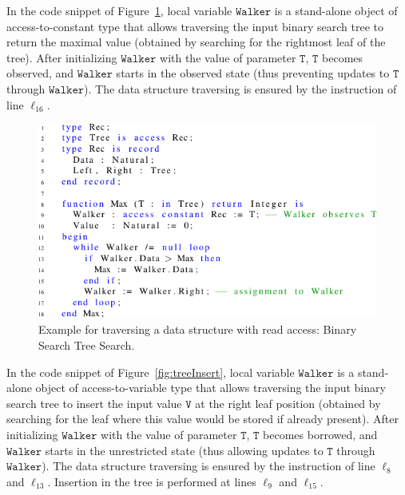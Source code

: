 \documentclass{llncs}
\newcommand\var[1]{\ensuremath{\mathtt{#1}}}
\begin{document}
\smallskip
In the code snippet of Figure~\ref{fig:maxTree}, local variable \var{Walker} is a stand-alone object of access-to-constant type that allows traversing the input binary
search tree to return the maximal value (obtained by searching for the rightmost leaf of the tree). After initializing \var{Walker} with the value of parameter \var{T},
\var{T} becomes observed, and \var{Walker} starts in the observed state (thus preventing updates to \var{T} through \var{Walker}). The data structure traversing is ensured by the instruction
of line $\ell_{16}$. 

\begin{figure}[htb!]
\centering
  \captionsetup{justification=centering,margin=0.6cm}
   \includegraphics[]{maxTree}
   \caption{Example for traversing a data structure with read access: Binary Search Tree Search.}
   \label{fig:maxTree}
\end{figure}


In the code snippet of Figure~\ref{fig:treeInsert}, local variable \var{Walker} is a stand-alone object of access-to-variable type that allows traversing the input binary
search tree to insert the input value \var{V} at the right leaf position (obtained by searching for the leaf where this value would be stored if already present).
After initializing \var{Walker} with the value of parameter \var{T}, \var{T} becomes borrowed, and \var{Walker} starts in the unrestricted state (thus allowing updates to \var{T} through \var{Walker}).
The data structure traversing is ensured by the instruction of line $\ell_8$ and $\ell_{13}$. Insertion in the tree is performed at lines
$\ell_9$ and $\ell_{15}$.
\end{document}
